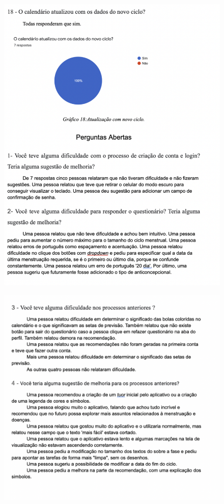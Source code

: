 \begin{apendicesenv}
\begin{figure}[ht]
        \includegraphics[keepaspectratio=true,scale=0.8]{figuras/ap10.png}
    \end{figure}
    \begin{figure}[ht]
        \centering
        \includegraphics[keepaspectratio=true,scale=0.8]{figuras/ap11.png}
    \end{figure}
    \end{apendicesenv}
    